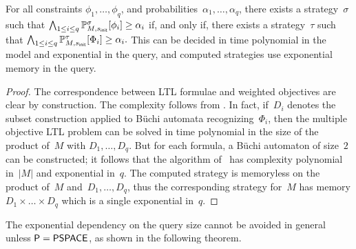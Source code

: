 \documentclass{llncs}
\newcommand{\initState}{\ensuremath{s_{{\sf init}}} }
\newcommand*{\pr}{\mathbb{P}}
\newcommand\PTIME{\textrm{\sf P}}
\newcommand\PSPACE{\textrm{\sf PSPACE}}
\begin{document}
\begin{lemma}
  For all constraints $\phi_1,\ldots,\phi_q$, and probabilities~$\alpha_1,\ldots,\alpha_q$,
  there exists a strategy~$\sigma$ such that $\bigwedge_{1\leq i\leq q} \pr_{M,\initState}^\sigma[\phi_i]\geq \alpha_i$
  if, and only if, there exists a strategy~$\tau$ such that $\bigwedge_{1\leq i \leq q} \pr_{M,\initState}^\tau[\Phi_i]\geq \alpha_i.$
  This can be decided in time polynomial in the model and exponential in the query, and computed strategies use exponential memory in the query.  
\end{lemma}
\begin{proof}
  The correspondence between LTL formulae and weighted objectives are clear by construction.
  The complexity follows from \cite{EKVY-lmcs08}. In fact, 
  if~$D_{i}$ denotes the subset construction applied to B\"uchi automata recognizing~$\Phi_i$, 
  then the multiple objective LTL problem can be solved in time polynomial in the size of
  the product of~$M$ with $D_1,\ldots,D_q$. But for each formula, a B\"uchi automaton of size~$2$ can be constructed; it follows that the algorithm of~\cite{EKVY-lmcs08} has complexity polynomial in~$|M|$ and exponential in~$q$. 
  The computed strategy is memoryless on the product of~$M$ and~$D_1,\ldots,D_q$, thus the corresponding strategy for~$M$ has memory $D_1\times\ldots\times D_q$ which is a single exponential in~$q$.
\end{proof}

The exponential dependency on the query size cannot be avoided in general unless $\PTIME = \PSPACE$, as shown in the following theorem.
\end{document}
